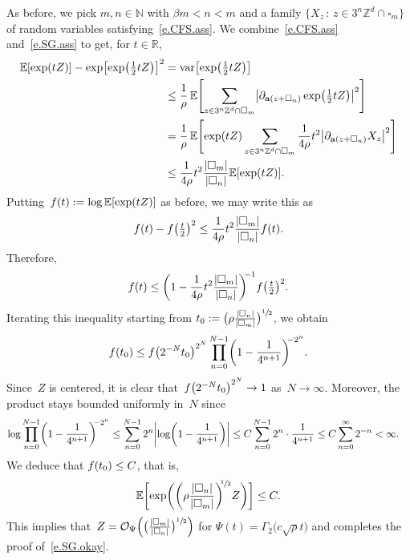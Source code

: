\documentclass[11pt]{article} %
\let\oldsquare\square %
\renewcommand{\square}{\oldsquare}
\numberwithin{equation}{section}
\theoremstyle{definition}
\let\originalleft\left
\let\originalright\right
\renewcommand{\left}{\mathopen{}\mathclose\bgroup\originalleft}
\renewcommand{\right}{\aftergroup\egroup\originalright}
\newcommand*{\N}{\ensuremath{\mathbb{N}}}
\newcommand*{\R}{\ensuremath{\mathbb{R}}}
\newcommand*{\Zd}{\ensuremath{\mathbb{Z}^d}}
\renewcommand{\a}{\mathbf{a}}
\newcommand{\cu}{\square}
\newcommand{\E}{\mathbb{E}}
\renewcommand{\O}{\mathcal{O}}
\DeclareMathOperator{\var}{var}
\begin{document}
As before, we pick $m,n\in\N$ with $\beta m<n<m$ and a family $\{ X_z \,:\, z\in 3^n\Zd\cap \cu_m\}$ of random variables satisfying~\eqref{e.CFS.ass}. We combine~\eqref{e.CFS.ass} and~\eqref{e.SG.ass} to get, for $t\in\R$,
\begin{align*}
\E \left[ \exp(tZ) \right] - \exp\left[ \exp\left(\tfrac12tZ\right) \right]^2 
&
= 
\var\left[  \exp\left(\tfrac12tZ\right)   \right]
\\ & 
\leq 
\frac1\rho\,
\E \Biggl[
\sum_{z\in 3^n\Zd \cap \cu_m}
\left| \partial_{\a(z+\cu_n)} \exp\left( \tfrac12tZ \right)
\right|^2
\Biggr]
\\ & 
=
\frac1\rho\,
\E \Biggl[  \exp\left( tZ \right) 
\sum_{z\in 3^n\Zd \cap \cu_m}
\frac1{4\rho}t^2 
\left| \partial_{\a(z+\cu_n)} X_z \right|^2
\Biggr]
\\ & 
\leq 
\frac1{4\rho}t^2 \frac{|\cu_m|}{|\cu_n|}
\E \left[  \exp\left( tZ \right) \right].
\end{align*}
Putting~$f(t):= \log \E \left[  \exp\left( t Z \right) \right]$ as before, we may write this as 
\begin{equation*} \label{}
f(t) - f\left(\tfrac t2\right)^2
\leq 
\frac1{4\rho}t^2 \frac{|\cu_m|}{|\cu_n|} f(t).
\end{equation*}
Therefore, 
\begin{equation*} \label{}
f(t) \leq \biggl( 1 - \frac1{4\rho}t^2 \frac{|\cu_m|}{|\cu_n|} \biggr)^{\!\!-1} f \left(\tfrac t2\right)^2.
\end{equation*}
Iterating this inequality starting from $t_0 := \bigl( \rho \frac{|\cu_n|}{|\cu_m|}  \bigr)^{\sfrac12}$, we obtain
\begin{equation*} \label{}
f\left( t_0 \right) 
\leq
f\left( 2^{-N}t_0 \right)^{2^N}
\prod_{n=0}^{N-1} \biggl( 1 - \frac1{4^{n+1}} \biggr)^{\!\!-2^n} .
\end{equation*}
Since~$Z$ is centered, it is clear that~$f\left(2^{-N} t_0 \right)^{2^N} \to 1$ as~$N\to \infty$. Moreover, the product stays bounded uniformly in~$N$ since
\begin{align*} \label{}
\log \prod_{n=0}^{N-1} \left( 1 - \frac1{4^{n+1}} \right)^{\!\!-2^n}
&
\leq
\sum_{n=0}^{N-1} 2^n
\left| \log \left( 1 - \frac1{4^{n+1}} \right) \right|
\leq
C \sum_{n=0}^{N-1} 2^n \cdot \frac1{4^{n+1}}
\leq C \sum_{n=0}^\infty 2^{-n} < \infty. 
\end{align*}
We deduce that $f\left(t_0\right) \leq C$, that is, 
\begin{equation*} \label{}
\E \biggl[ \exp\biggl( \biggl( \rho \frac{|\cu_n|}{|\cu_m|}  \biggr)^{\!\!\sfrac12} Z \biggr) \biggr] \leq C. 
\end{equation*}
This implies that~$Z = \O_{\Psi}\Big (\bigl( \frac{|\cu_m|}{|\cu_n|}\bigr)^{\sfrac12}   \Bigr)$ for $\Psi(t)=\Gamma_2\bigl(c\sqrt{\rho}t \bigr)$ and completes the proof of~\eqref{e.SG.okay}. 
\end{document}
